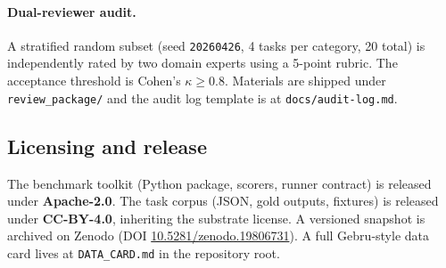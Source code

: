 \paragraph{Dual-reviewer audit.} A stratified random subset (seed
\texttt{20260426}, 4 tasks per category, 20 total) is independently rated by
two domain experts using a 5-point rubric. The acceptance threshold is Cohen's
$\kappa \geq 0.8$. Materials are shipped under \texttt{review\_package/} and
the audit log template is at \texttt{docs/audit-log.md}.

\subsection{Licensing and release}

The benchmark toolkit (Python package, scorers, runner contract) is released
under \textbf{Apache-2.0}. The task corpus (JSON, gold outputs, fixtures) is
released under \textbf{CC-BY-4.0}, inheriting the substrate license. A
versioned snapshot is archived on Zenodo
(DOI \href{https://doi.org/10.5281/zenodo.19806731}{10.5281/zenodo.19806731}).
A full Gebru-style data card lives at \texttt{DATA\_CARD.md} in the repository
root.
